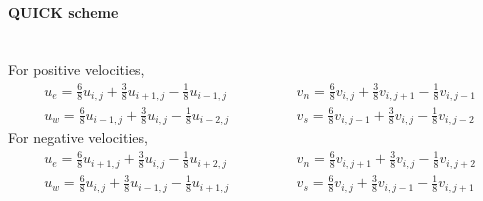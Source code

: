 \documentclass[12pt,a4paper,fleqn]{article}
\begin{document}
\paragraph{QUICK scheme}\mbox{}\\
For positive velocities,
\begin{equation*}
\begin{aligned}
u_e = \tfrac{6}{8}u_{i,j} + \tfrac{3}{8}u_{i+1,j} - \tfrac{1}{8}u_{i-1,j}\\
u_w = \tfrac{6}{8}u_{i-1,j} + \tfrac{3}{8}u_{i,j} - \tfrac{1}{8}u_{i-2,j}
\end{aligned}
\qquad\qquad
\begin{aligned}
v_n = \tfrac{6}{8}v_{i,j} + \tfrac{3}{8}v_{i,j+1} - \tfrac{1}{8}v_{i,j-1}\\
v_s = \tfrac{6}{8}v_{i,j-1} + \tfrac{3}{8}v_{i,j} - \tfrac{1}{8}v_{i,j-2}
\end{aligned}
\end{equation*}
For negative velocities,
\begin{equation*}
\begin{aligned}
u_e = \tfrac{6}{8}u_{i+1,j} + \tfrac{3}{8}u_{i,j} - \tfrac{1}{8}u_{i+2,j}\\
u_w = \tfrac{6}{8}u_{i,j} + \tfrac{3}{8}u_{i-1,j} - \tfrac{1}{8}u_{i+1,j}
\end{aligned}
\qquad\qquad
\begin{aligned}
v_n = \tfrac{6}{8}v_{i,j+1} + \tfrac{3}{8}v_{i,j} - \tfrac{1}{8}v_{i,j+2}\\
v_s = \tfrac{6}{8}v_{i,j} + \tfrac{3}{8}v_{i,j-1} - \tfrac{1}{8}v_{i,j+1}
\end{aligned}
\end{equation*}
\end{document}
